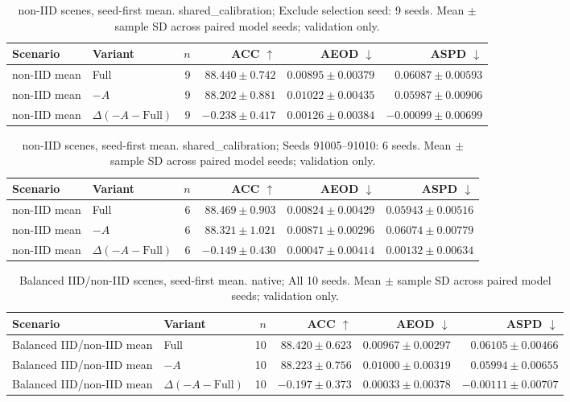 \begin{table}[t]
\centering
\small
\caption{non-IID scenes, seed-first mean. shared\_calibration; Exclude selection seed: 9 seeds. Mean $\pm$ sample SD across paired model seeds; validation only.}
\begin{tabular}{llrrrr}
\toprule
Scenario & Variant & $n$ & ACC $\uparrow$ & AEOD $\downarrow$ & ASPD $\downarrow$ \\
\midrule
non-IID mean & Full & 9 & $88.440 \pm 0.742$ & $0.00895 \pm 0.00379$ & $0.06087 \pm 0.00593$ \\
non-IID mean & $-A$ & 9 & $88.202 \pm 0.881$ & $0.01022 \pm 0.00435$ & $0.05987 \pm 0.00906$ \\
non-IID mean & $\Delta(-A-\mathrm{Full})$ & 9 & $-0.238 \pm 0.417$ & $0.00126 \pm 0.00384$ & $-0.00099 \pm 0.00699$ \\
\bottomrule
\end{tabular}
\end{table}

\begin{table}[t]
\centering
\small
\caption{non-IID scenes, seed-first mean. shared\_calibration; Seeds 91005–91010: 6 seeds. Mean $\pm$ sample SD across paired model seeds; validation only.}
\begin{tabular}{llrrrr}
\toprule
Scenario & Variant & $n$ & ACC $\uparrow$ & AEOD $\downarrow$ & ASPD $\downarrow$ \\
\midrule
non-IID mean & Full & 6 & $88.469 \pm 0.903$ & $0.00824 \pm 0.00429$ & $0.05943 \pm 0.00516$ \\
non-IID mean & $-A$ & 6 & $88.321 \pm 1.021$ & $0.00871 \pm 0.00296$ & $0.06074 \pm 0.00779$ \\
non-IID mean & $\Delta(-A-\mathrm{Full})$ & 6 & $-0.149 \pm 0.430$ & $0.00047 \pm 0.00414$ & $0.00132 \pm 0.00634$ \\
\bottomrule
\end{tabular}
\end{table}

\begin{table}[t]
\centering
\small
\caption{Balanced IID/non-IID scenes, seed-first mean. native; All 10 seeds. Mean $\pm$ sample SD across paired model seeds; validation only.}
\begin{tabular}{llrrrr}
\toprule
Scenario & Variant & $n$ & ACC $\uparrow$ & AEOD $\downarrow$ & ASPD $\downarrow$ \\
\midrule
Balanced IID/non-IID mean & Full & 10 & $88.420 \pm 0.623$ & $0.00967 \pm 0.00297$ & $0.06105 \pm 0.00466$ \\
Balanced IID/non-IID mean & $-A$ & 10 & $88.223 \pm 0.756$ & $0.01000 \pm 0.00319$ & $0.05994 \pm 0.00655$ \\
Balanced IID/non-IID mean & $\Delta(-A-\mathrm{Full})$ & 10 & $-0.197 \pm 0.373$ & $0.00033 \pm 0.00378$ & $-0.00111 \pm 0.00707$ \\
\bottomrule
\end{tabular}
\end{table}

